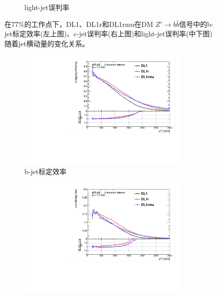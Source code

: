 \begin{figure}[!thbp]
\begin{subfigure}{.99\textwidth}
  \caption{light-jet误判率}
  \end{subfigure}
\caption{
在77\%的工作点下，DL1、DL1r和DL1rmu在DM $Z\prime\rightarrow b\bar{b}$信号中的b-jet标定效率(左上图)、c-jet误判率(右上图)和light-jet误判率(中下图)随着jet横动量的变化关系。
}
\label{fig:btagperf_zprime_fix77}
\end{figure}



\begin{figure}[!thbp]
  \begin{subfigure}{.5\textwidth}
  \centering
  \includegraphics[width=0.9\textwidth]{figuresDijet/02-Selection/QCD/Comparebtageff_Fix77.pdf}
  \caption{b-jet标定效率}
  \end{subfigure}
  \begin{subfigure}{.5\textwidth}
  \centering
   \includegraphics[width=0.9\textwidth]{figuresDijet/02-Selection/QCD/Comparectageff_Fix77.pdf}

\end{subfigure}
\end{figure}
